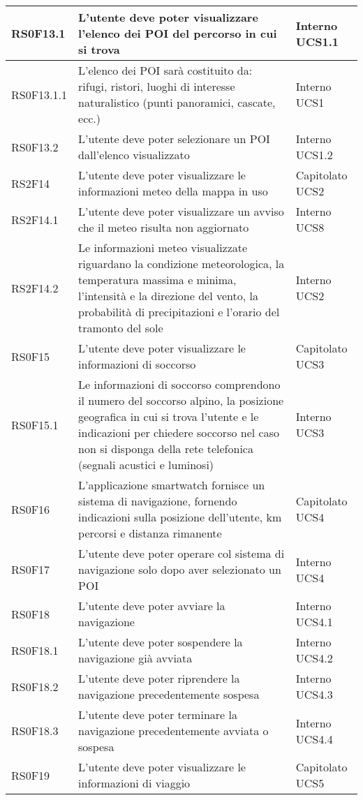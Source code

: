 \begin{center}
\begin{longtable}{|l|p{7cm}|p{1.7cm}|}
RS0F13.1	& L'utente deve poter visualizzare l'elenco dei POI del percorso in cui si trova & Interno UCS1.1 \\\hline
RS0F13.1.1	& L'elenco dei POI sarà costituito da: rifugi, ristori, luoghi di interesse naturalistico (punti panoramici, cascate, ecc.) & Interno UCS1 \\\hline
RS0F13.2	& L'utente deve poter selezionare un POI dall'elenco visualizzato & Interno UCS1.2 \\\hline
RS2F14		& L'utente deve poter visualizzare le informazioni meteo della mappa in uso & Capitolato UCS2 \\\hline
RS2F14.1	& L'utente deve poter visualizzare un avviso che il meteo risulta non aggiornato & Interno UCS8 \\\hline
RS2F14.2	& Le informazioni meteo visualizzate riguardano la condizione meteorologica, la temperatura massima e minima, l'intensità e la direzione del vento, la probabilità di precipitazioni e l'orario del tramonto del sole & Interno UCS2 \\\hline
RS0F15		& L'utente deve poter visualizzare le informazioni di soccorso & Capitolato UCS3 \\\hline
RS0F15.1	& Le informazioni di soccorso comprendono il numero del soccorso alpino, la posizione geografica in cui si trova l'utente e le indicazioni per chiedere soccorso nel caso non si disponga della rete telefonica (segnali acustici e luminosi) & Interno UCS3 \\\hline
RS0F16		& L'applicazione smartwatch fornisce un sistema di navigazione, fornendo indicazioni sulla posizione dell’utente, km percorsi e distanza rimanente & Capitolato UCS4 \\\hline
RS0F17		& L'utente deve poter operare col sistema di navigazione solo dopo aver selezionato un POI & Interno UCS4 \\\hline
RS0F18		& L'utente deve poter avviare la navigazione & Interno UCS4.1 \\\hline
RS0F18.1	& L'utente deve poter sospendere la navigazione già avviata & Interno UCS4.2 \\\hline
RS0F18.2	& L'utente deve poter riprendere la navigazione precedentemente sospesa & Interno UCS4.3 \\\hline
RS0F18.3	& L'utente deve poter terminare la navigazione precedentemente avviata o sospesa & Interno UCS4.4 \\\hline
RS0F19		& L'utente deve poter visualizzare le informazioni di viaggio & Capitolato UCS5 \\\hline

\end{longtable}
\end{center}

